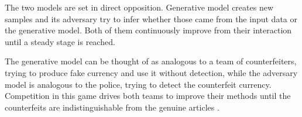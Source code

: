 The two models are set in direct opposition. Generative model creates new samples and its adversary try to infer whether those came from the input data or the generative model. Both of them continuously improve from their interaction until a steady stage is reached.


The generative model can be thought of as analogous to a team of counterfeiters, trying to produce fake currency and use it without detection, while the adversary model is analogous to the police, trying to detect the counterfeit currency. Competition in this game drives both teams to improve their methods until the counterfeits are indistinguishable from the genuine articles \cite{goodfellow2014generative}.
